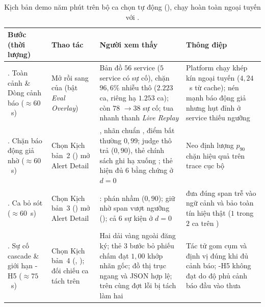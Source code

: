 \begin{table}[H]
  \centering
  \caption[Kịch bản demo năm phút trên giao diện điều hành]{Kịch bản demo năm phút trên bộ ca chọn tự động (), chạy hoàn toàn ngoại tuyến với .}
  \label{tab:ch6-kich-ban}
  \tblfont
  \tblsetup
  \setlength{\tabcolsep}{3.5pt}
  \begin{tabularx}{\linewidth}{|>{\raggedright\arraybackslash}p{2.4cm}|>{\raggedright\arraybackslash}p{3.8cm}|Y|>{\raggedright\arraybackslash}p{3.3cm}|}
    \hline
    \textbf{Bước (thời lượng)} & \textbf{Thao tác} & \textbf{Người xem thấy} & \textbf{Thông điệp} \\
    . Toàn cảnh \& Dòng cảnh báo ($\approx 60$~s) & Mở  rồi sang  của  (bật \emph{Eval Overlay}) & Bản đồ $56$ service ($5$ service có sự cố), chặn $96{,}6\%$ nhiễu thô ($2.223$ ca, riêng  hạ $1.253$ ca); còn $78$  $\to 38$ sự cố; tua nhanh thanh \emph{Live Replay} & Platform chạy khép kín ngoại tuyến ($4{,}24$~s từ cache); \CTAV{} nén mạnh báo động giả nhưng hụt đỉnh ở service thiếu ngưỡng  \\
    . Chặn báo động giả nhờ  ($\approx 60$~s) & Chọn Kịch bản~2 () mở Alert Detail & , nhãn chuẩn , điểm bất thường $0{,}99$; judge thô trả  ($0{,}90$), thẻ chính sách ghi  hạ xuống ; thẻ  hiện đủ $6$ bằng chứng ở $d = 0$ & Neo định lượng $p_{90}$ chặn hiệu quả  trên trace cục bộ \\
    . Ca   bỏ sót ($\approx 60$~s) & Chọn Kịch bản~3 () mở Alert Detail & :  phán nhầm  ($0{,}90$); \CTAV{} giữ  nhờ span  vượt ngưỡng  (); cả $6$ sự kiện ở $d = 0$ &  đưa đúng span trễ vào ngữ cảnh và  bảo toàn tín hiệu thật ($1$ trong $2$ ca trên ) \\
    . Sự cố cascade \& giới hạn \hyp{H5} ($\approx 75$~s) & Chọn Kịch bản~4 (, ); đối chiếu ca tách  trên  & Hai dải vàng ngoài đăng ký; thẻ 3 bước bỏ phiếu chấm  đạt $1{,}00$ khớp nhãn gốc; đồ thị trục ngang và JSON hợp lệ; trên  cùng đợt lỗi bị tách làm hai & Tác tử  gom cụm và định vị đúng khi đủ cảnh báo; \hyp{H5} không đạt do độ phủ cảnh báo đầu vào thưa \\

\end{tabularx}
\end{table}
